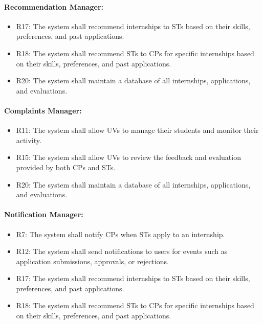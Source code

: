 \paragraph{Recommendation Manager:}
\begin{itemize}
    \item R17: The system shall recommend internships to STs based on their skills, preferences, and past applications.
    \item R18: The system shall recommend STs to CPs for specific internships based on their skills, preferences, and past applications.
    \item R20: The system shall maintain a database of all internships, applications, and evaluations.
\end{itemize}

\paragraph{Complaints Manager:}
\begin{itemize}
    \item R11: The system shall allow UVs to manage their students and monitor their activity.
    \item R15: The system shall allow UVs to review the feedback and evaluation provided by both CPs and STs.
    \item R20: The system shall maintain a database of all internships, applications, and evaluations.
\end{itemize}

\paragraph{Notification Manager:}
\begin{itemize}
    \item R7: The system shall notify CPs when STs apply to an internship.
    \item R12: The system shall send notifications to users for events such as application submissions, approvals, or rejections.
    \item R17: The system shall recommend internships to STs based on their skills, preferences, and past applications.
    \item R18: The system shall recommend STs to CPs for specific internships based on their skills, preferences, and past applications.
\end{itemize}
